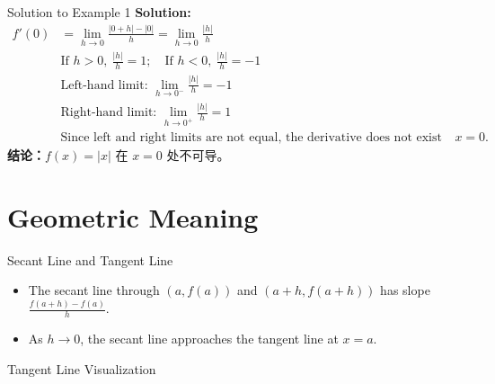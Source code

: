 \documentclass[aspectratio=169]{beamer}
\begin{document}
\begin{frame}{Solution to Example 1}
\textbf{Solution:}
\\
\[
\begin{aligned}
  f'(0) &= \lim_{h \to 0} \frac{|0+h| - |0|}{h} = \lim_{h \to 0} \frac{|h|}{h} \\
  &\text{If } h>0, \ \frac{|h|}{h} = 1; \quad \text{If } h<0, \ \frac{|h|}{h} = -1 \\
  &\text{Left-hand limit: } \lim_{h \to 0^-} \frac{|h|}{h} = -1 \\
  &\text{Right-hand limit: } \lim_{h \to 0^+} \frac{|h|}{h} = 1 \\
  &\text{Since left and right limits are not equal, the derivative does not exist at } x=0.
\end{aligned}
\]
\textbf{结论：}$f(x)=|x|$ 在 $x=0$ 处不可导。
\end{frame}

\section{Geometric Meaning}

\begin{frame}{Secant Line and Tangent Line}
\begin{itemize}
  \item The secant line through $(a, f(a))$ and $(a+h, f(a+h))$ has slope $\frac{f(a+h)-f(a)}{h}$.
  \item As $h \to 0$, the secant line approaches the tangent line at $x=a$.
\end{itemize}
\end{frame}

\begin{frame}{Tangent Line Visualization}
\begin{center}
\end{center}
\end{frame}
\end{document}
